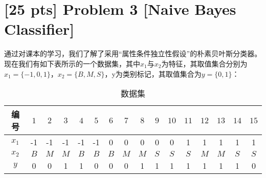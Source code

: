 \documentclass[a4paper,UTF8]{article}
\theoremstyle{definition}
\begin{document}
\section*{[25 pts] Problem 3 [Naive Bayes Classifier]}
通过对课本的学习，我们了解了采用“属性条件独立性假设”的朴素贝叶斯分类器。现在我们有如下表所示的一个数据集，其中$x_1$与$x_2$为特征，其取值集合分别为$x_1=\{-1,0,1\}$，$x_2=\{B,M,S\}$，y为类别标记，其取值集合为$y=\{0,1\}$：
	\begin{table}[htp]
		\centering
		\caption{数据集}\label{tab:aStrangeTable}
	\begin{tabular}{cccccccccccccccc}
		\hline 
	编号	& $1$ & $2$ & $3$ & $4$ & $5$ & $6$ & $7$ & $8$ & $9$ & $10$ & $11$ & $12$ & $13$ & $14$ & $15$\\ 
		\hline 
	$x_1$	& -1 & -1 & -1 & -1 & -1 & 0 & 0 & 0 & 0 & 0 & 1 & 1 & 1 & 1 & 1 \\ 
		\hline 
	$x_2$	& $B$ &$M$ &$M$ &$B$ &$B$ &$B$ &$M$ &$M$ &$S$ &$S$ &$S$ &$M$ &$M$ &$S$ &$S$  \\ 
		\hline 
	$y$	& 0 & 0 & 1 & 1 & 0 & 0 & 0 & 1 & 1 & 1 & 1 & 1 & 1 & 1 & 0 \\ 
		\hline 
	\end{tabular}
	\end{table} 
	
\end{document}

